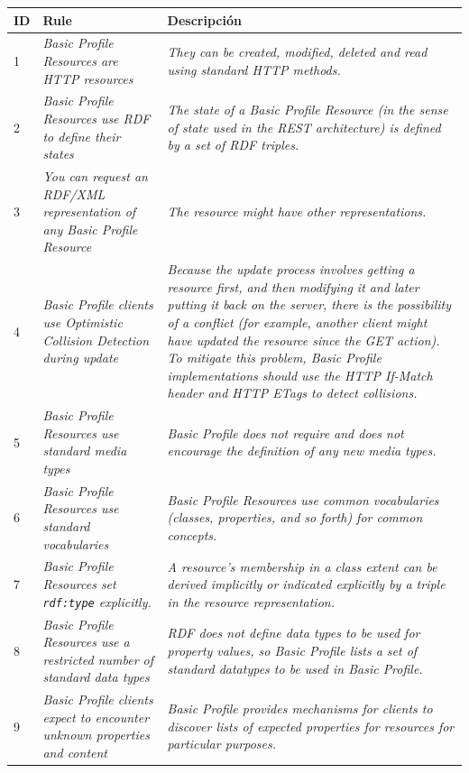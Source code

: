 \begin{longtable}[c]{|l|p{6.5cm}|p{7.5cm}|} 
\hline
  \textbf{ID} & \textbf{Rule} & \textbf{Descripción} \\\hline
\endhead
  1 &  \textit{Basic Profile Resources are \gls{HTTP} resources} & \textit{They can be created, modified, deleted and read using standard HTTP methods.}\\ \hline
  2 &  \textit{Basic Profile Resources use \gls{RDF} to define their states} & \textit{The state of a Basic Profile Resource (in the sense of state used in the REST architecture) is defined by a set of RDF triples.} \\ \hline
  3 &  \textit{You can request an RDF/XML representation of any Basic Profile Resource} &   \textit{The resource might have other representations.} \\ \hline
  4 &  \textit{Basic Profile clients use Optimistic Collision Detection during update} &   \textit{Because the update process involves getting a resource first, and then modifying it and later putting it back on the server, there is the possibility of a conflict (for example, another client might have updated the resource since the GET action). To mitigate this problem, Basic Profile implementations should use the HTTP If-Match header and HTTP ETags to detect collisions.} \\ \hline
  5 &  \textit{Basic Profile Resources use standard media types} &   \textit{ Basic Profile does not require and does not encourage the definition of any new media types.} \\ \hline
  6 &  \textit{Basic Profile Resources use standard vocabularies} &   \textit{Basic Profile Resources use common vocabularies (classes, properties, and so forth) for common concepts.} \\ \hline
  7 &  \textit{Basic Profile Resources set \texttt{rdf:type} explicitly.} &   \textit{A resource's membership in a class extent can be derived implicitly or indicated explicitly by a triple in the resource representation.} \\ \hline
  8 &  \textit{Basic Profile Resources use a restricted number of standard data types} &   \textit{RDF does not define data types to be used for property values, so Basic Profile lists a set of standard datatypes to be used in Basic Profile.} \\ \hline
  9 &  \textit{Basic Profile clients expect to encounter unknown properties and content} &   \textit{Basic Profile provides mechanisms for clients to discover lists of expected properties for resources for particular purposes.} \\ \hline

\end{longtable}
